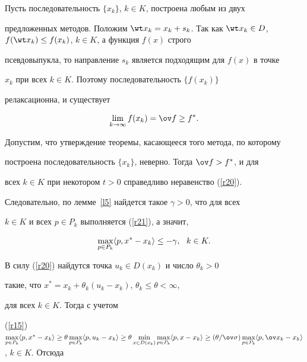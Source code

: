 \begin{pf}


Пусть последовательность $\{x_k\}$, $k\in K$, построена любым из двух


предложенных методов. Положим $\wt x_k= x_k+s_k$. Так как $\wt x_k\in


D$, $f(\wt x_k)\le f(x_k)$, $k\in K$, а функция $f(x)$ строго


псевдовыпукла, то направление $s_k$ является подходящим для $f(x)$ в точке


$x_k$ при всех $k\in K$. Поэтому последовательность $\{f(x_k)\}$


релаксационна, и существует


$$


\lim \limits_{k\to \infty} f(x_k)=\ov f\ge f^*.


$$


Допустим, что утверждение теоремы, касающееся того метода, по которому


построена последовательность $\{x_k\}$, неверно. Тогда $\ov f> f^*$, и для


всех $k\in K$ при некотором $t>0$ справедливо неравенство (\ref{r20}).


Следовательно, по лемме~\ref{l5} найдется такое $\gamma>0$, что для всех


$k\in K$ и всех $p\in P_k$ выполняется (\ref{r21}), а значит,




\begin{equation} \label{r26}


\max_{p\in P_k} \la p, x^*-x_k\ra \le -\gamma, \ \ k\in K.


\end{equation}


%


В силу (\ref{r20}) найдутся точка $u_k\in D(x_k)$ и число $\theta_k>0$


такие, что $x^* = x_k+ \theta_k(u_k-x_k)$, $\theta_k\le \theta < \infty$,


для всех $k\in K$. Тогда с учетом


(\ref{r15}) \ $\max \limits_{p\in P_k} \la p, x^*-x_k \ra \ge


\theta \max \limits_{p\in P_k} \la p, u_k-x_k \ra \ge


\theta \min \limits_{x\in D(x_k)}


\max \limits_{p\in P_k} \la p, x-x_k \ra \ge


(\theta/ \ov \sigma)


\max \limits_{p\in P_k} \la p, \ov x_k-x_k \ra $, $k\in K$. Отсюда



\end{pf}
